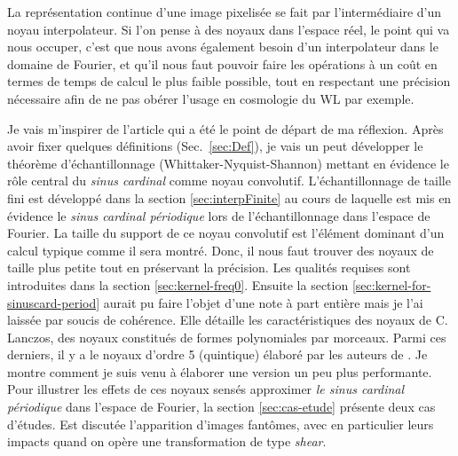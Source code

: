 \documentclass[11pt,twoside]{article}
\begin{document}
La représentation continue d'une image pixelisée se fait par l'intermédiaire d'un noyau interpolateur. Si l'on pense à des noyaux dans l'espace réel, le point qui va nous occuper, c'est que nous avons également besoin d'un interpolateur dans le domaine de Fourier, et qu'il nous faut pouvoir faire les opérations à un coût en termes de temps de calcul le plus faible possible, tout en respectant une précision nécessaire afin de ne pas obérer l'usage en cosmologie du WL par exemple. 

Je vais m'inspirer de l'article \cite{2014PASP..126..287B} qui a été le point de départ de ma réflexion. Après avoir fixer quelques définitions (Sec.~\ref{sec:Def}), je vais un peut développer le théorème d'échantillonnage (Whittaker-Nyquist-Shannon) mettant en évidence le rôle central du \textit{sinus cardinal} comme noyau convolutif. L'échantillonnage de taille fini est développé dans la section \ref{sec:interpFinite} au cours de laquelle est mis en évidence le \textit{sinus cardinal périodique}  lors de l'échantillonnage dans l'espace de Fourier. La taille du support de ce noyau convolutif est l'élément dominant d'un calcul typique comme il sera montré. Donc, il nous faut trouver des noyaux de taille plus petite tout en préservant la précision. Les qualités requises sont introduites dans la section \ref{sec:kernel-freq0}. Ensuite la section \ref{sec:kernel-for-sinuscard-period} aurait pu faire l'objet d'une note à part entière mais je l'ai laissée par soucis de cohérence. Elle détaille les caractéristiques des noyaux de C. Lanczos, des noyaux constitués de formes polynomiales par morceaux. Parmi ces derniers, il y a le noyaux d'ordre 5 (quintique) élaboré par les auteurs de \cite{2014PASP..126..287B}. Je montre comment je suis venu à élaborer une version un peu plus performante. Pour illustrer les effets de ces noyaux sensés approximer \textit{le sinus cardinal périodique} dans l'espace de Fourier, la section \ref{sec:cas-etude} présente deux cas d'études. Est discutée l'apparition d'images fantômes,  avec en particulier leurs impacts quand on opère une transformation de type \textit{shear}. 
%
\end{document}

